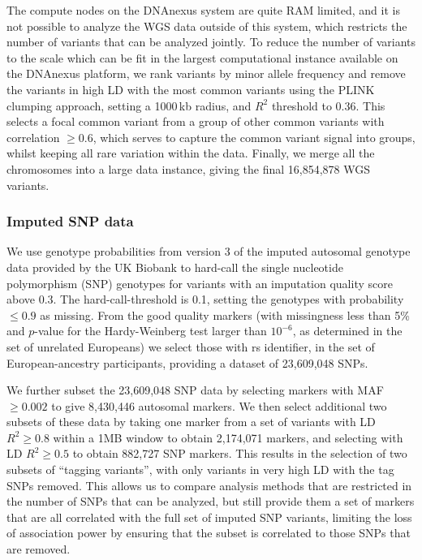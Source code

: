 The compute nodes on the DNAnexus system are quite RAM limited, and it is not possible to analyze the WGS data outside of this system, which restricts the number of variants that can be analyzed jointly. To reduce the number of variants to the scale which can be fit in the largest computational instance available on the DNAnexus platform, we rank variants by minor allele frequency and remove the variants in high LD with the most common variants using the PLINK clumping approach, setting a 1000\,kb radius, and $R^2$ threshold to 0.36. This selects a focal common variant from a group of other common variants with correlation $\geq 0.6$, which serves to capture the common variant signal into groups, whilst keeping all rare variation within the data. Finally, we merge all the chromosomes into a large data instance, giving the final 16,854,878 WGS variants.

\subsubsection{Imputed SNP data}
We use genotype probabilities from version 3 of the imputed autosomal genotype data provided by the UK Biobank to hard-call the single nucleotide polymorphism (SNP) genotypes for variants with an imputation quality score above 0.3. The hard-call-threshold is 0.1, setting the genotypes with probability $\leq0.9$ as missing. From the good quality markers (with missingness less than 5\% and $p$-value for the Hardy-Weinberg test larger than $10^{-6}$, as determined in the set of unrelated Europeans) we select those with rs identifier, in the set of European-ancestry participants, providing a dataset of 23,609,048 SNPs.

We further subset the 23,609,048 SNP data by selecting markers with MAF $\geq 0.002$ to give 8,430,446 autosomal markers. We then select additional two subsets of these data by taking one marker from a set of variants with LD $R^2 \geq 0.8$ within a 1MB window to obtain 2,174,071 markers, and selecting with LD $R^2 \geq 0.5$ to obtain 882,727 SNP markers. This results in the selection of two subsets of ``tagging variants'', with only variants in very high LD with the tag SNPs removed. This allows us to compare analysis methods that are restricted in the number of SNPs that can be analyzed, but still provide them a set of markers that are all correlated with the full set of imputed SNP variants, limiting the loss of association power by ensuring that the subset is correlated to those SNPs that are removed.

